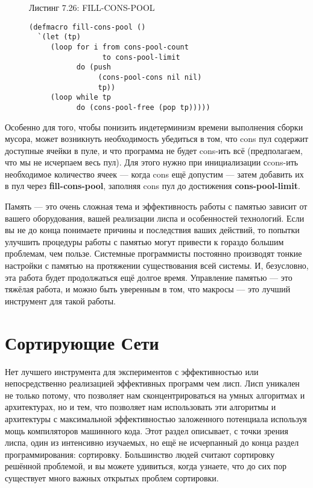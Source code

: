 \begin{figure}Листинг 7.26: FILL-CONS-POOL\label{listing_7.26}
\listbegin
\begin{verbatim}
(defmacro fill-cons-pool ()
  `(let (tp)
     (loop for i from cons-pool-count
                 to cons-pool-limit
           do (push
                (cons-pool-cons nil nil)
                tp))
     (loop while tp
           do (cons-pool-free (pop tp)))))
\end{verbatim}
\listend
\end{figure}

Особенно для того, чтобы понизить индетерминизм времени выполнения сборки мусора, может возникнуть необходимость убедиться в том, что cons пул содержит доступные ячейки в пуле, и что программа не будет cons-ить всё (предполагаем, что мы не исчерпаем весь пул). Для этого нужно при инициализации сcons-ить необходимое количество ячеек --- когда cons ещё допустим --- затем добавить их в пул через \textbf{fill-cons-pool}, заполняя cons пул до достижения \textbf{cons-pool-limit}.

Память --- это очень сложная тема и эффективность работы с памятью зависит от вашего оборудования, вашей реализации лиспа и особенностей технологий. Если вы не до конца понимаете причины и последствия ваших действий, то попытки улучшить процедуры работы с памятью могут привести к гораздо большим проблемам, чем пользе. Системные программисты постоянно производят тонкие настройки с памятью на протяжении существования всей системы. И, безусловно, эта работа будет продолжаться ещё долгое время. Управление памятью --- это тяжёлая работа, и  можно быть уверенным в том, что макросы --- это лучший инструмент для такой работы.

\section{Сортирующие Сети}\label{sorting_networks}

Нет лучшего инструмента для экспериментов с эффективностью или непосредственно реализацией эффективных программ чем лисп. Лисп уникален не только потому, что позволяет нам сконцентрироваться на умных алгоритмах и архитектурах, но и тем, что позволяет нам использовать эти алгоритмы и архитектуры с максимальной эффективностью заложенного потенциала используя мощь компиляторов машинного кода. Этот раздел описывает, с точки зрения лиспа, один из интенсивно изучаемых, но ещё не исчерпанный до конца раздел программирования: сортировку. Большинство людей считают сортировку решённой проблемой, и вы можете удивиться, когда узнаете, что до сих пор существует много важных открытых проблем сортировки.

